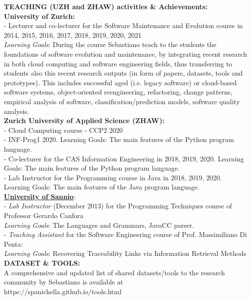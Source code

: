 \documentclass[12pt]{article}
\begin{document}
\textbf{TEACHING (UZH and ZHAW) activities \& Achievements:}\\
\textbf{University of Zurich:} \\
-   Lecturer and co-lecturer for the Software Maintenance and Evolution course in 2014, 2015, 2016, 2017, 2018, 2019, 2020, 2021\\   \textit{Learning Goals}: During the course Sebastiano teach to
the students the foundations of software evolution and maintenance, by integrating recent research in both cloud computing and
software engineering fields, thus transferring to students also this recent research outputs (in form of papers, datasets, tools and
prototypes). This includes successful aged (i.e. legacy software) or cloud-based software systems, object-oriented reengineering,
refactoring, change patterns, empirical analysis of software, classification/prediction models, software quality analysis.\\
\textbf{Zurich University of Applied Science (ZHAW):}\\
- Cloud Computing course - CCP2 2020\\
- INF-Prog1 2020. Learning Goals: The main features of the Python program language.\\
- Co-lecturer for the CAS Information Engineering in 2018, 2019, 2020.
Learning Goals: The main features of the Python program language.\\
- Lab Instructor for the Programming course in Java in 2018, 2019, 2020.
Learning Goals: The main features of the Java program language.\\


\href{http://www.unisa.it}{\textbf{University of Sannio}}:\\

- \textit{Lab Instructor} (December 2013) for the Programming Techniques course of Professor Gerardo Canfora\\   \textit{Learning Goals}:   The Languages ​​and Grammars, JavaCC parser.\\
- \textit{Teaching Assistant } for the Software Engineering course of Prof. Massimiliano Di Penta:\\   \textit{Learning Goals}:   
Recovering Traceability Links via Information Retrieval Methods\\


\textbf{DATASET \& TOOLS:}\\
A comprehensive and updated list of shared datasets/tools to the research community by Sebastiano is available at\\ https://spanichella.github.io/tools.html\\
\end{document}
